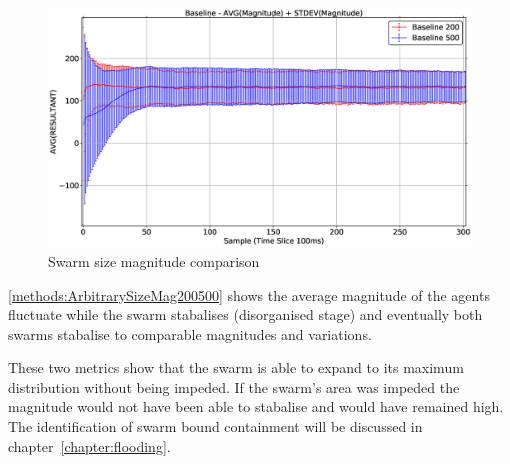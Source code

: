 \begin{figure}[H]
\begin{center}
\includegraphics[width=13cm]{CHAPTER-5/figures/ArbitrarySize200500MAG}
\end{center}
\caption{Swarm size magnitude comparison\label{methods:ArbitrarySizeMag200500}}
\end{figure}

\autoref{methods:ArbitrarySizeMag200500} shows the average magnitude of the agents fluctuate while the swarm stabalises (disorganised stage) and eventually both swarms stabalise to comparable magnitudes and variations.

These two metrics show that the swarm is able to expand to its maximum distribution without being impeded. If the swarm's area was impeded the magnitude would not have been able to stabalise and would have remained high. The identification of swarm bound containment will be discussed in chapter~\ref{chapter:flooding}.



